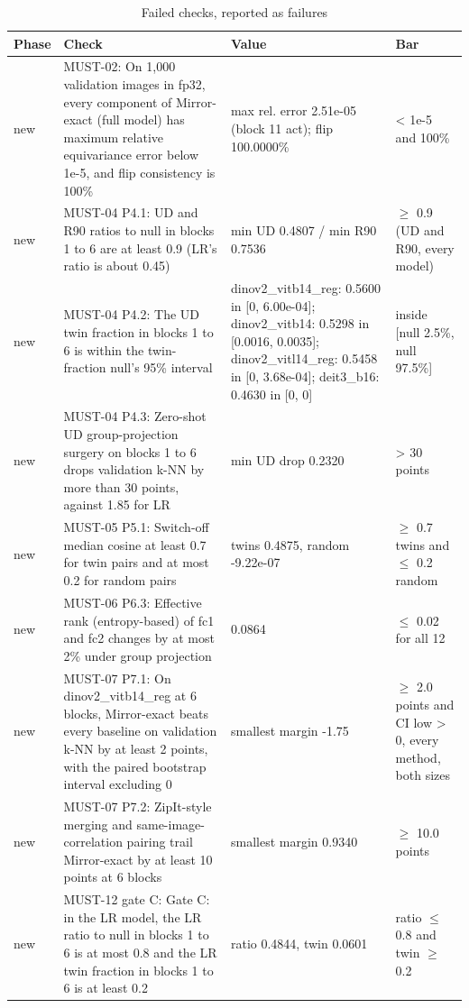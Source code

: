 \begin{table}[t]
\centering
\small
\caption{Failed checks, reported as failures}
\label{tab:appendix_a4_failed}
\begin{tabular}{llll}
\toprule
Phase & Check & Value & Bar \\
\midrule
new & MUST-02: On 1,000 validation images in fp32, every component of Mirror-exact (full model) has maximum relative equivariance error below 1e-5, and flip consistency is 100\% & max rel. error 2.51e-05 (block 11 act); flip 100.0000\% & < 1e-5 and 100\% \\
new & MUST-04 P4.1: UD and R90 ratios to null in blocks 1 to 6 are at least 0.9 (LR's ratio is about 0.45) & min UD 0.4807 / min R90 0.7536 & $\ge$ 0.9 (UD and R90, every model) \\
new & MUST-04 P4.2: The UD twin fraction in blocks 1 to 6 is within the twin-fraction null's 95\% interval & dinov2\_vitb14\_reg: 0.5600 in [0, 6.00e-04]; dinov2\_vitb14: 0.5298 in [0.0016, 0.0035]; dinov2\_vitl14\_reg: 0.5458 in [0, 3.68e-04]; deit3\_b16: 0.4630 in [0, 0] & inside [null 2.5\%, null 97.5\%] \\
new & MUST-04 P4.3: Zero-shot UD group-projection surgery on blocks 1 to 6 drops validation k-NN by more than 30 points, against 1.85 for LR & min UD drop 0.2320 & > 30 points \\
new & MUST-05 P5.1: Switch-off median cosine at least 0.7 for twin pairs and at most 0.2 for random pairs & twins 0.4875, random -9.22e-07 & $\ge$ 0.7 twins and $\le$ 0.2 random \\
new & MUST-06 P6.3: Effective rank (entropy-based) of fc1 and fc2 changes by at most 2\% under group projection & 0.0864 & $\le$ 0.02 for all 12 \\
new & MUST-07 P7.1: On dinov2\_vitb14\_reg at 6 blocks, Mirror-exact beats every baseline on validation k-NN by at least 2 points, with the paired bootstrap interval excluding 0 & smallest margin -1.75 & $\ge$ 2.0 points and CI low > 0, every method, both sizes \\
new & MUST-07 P7.2: ZipIt-style merging and same-image-correlation pairing trail Mirror-exact by at least 10 points at 6 blocks & smallest margin 0.9340 & $\ge$ 10.0 points \\
new & MUST-12 gate C: Gate C: in the LR model, the LR ratio to null in blocks 1 to 6 is at most 0.8 and the LR twin fraction in blocks 1 to 6 is at least 0.2 & ratio 0.4844, twin 0.0601 & ratio $\le$ 0.8 and twin $\ge$ 0.2 \\

\end{tabular}
\end{table}

